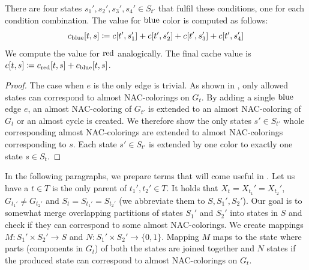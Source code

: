 \begin{lemma}
\begin{description}
	\end{description}
	There are four states \( s_1', s_2', s_3', s_4' \in S_{t'} \)
	that fulfil these conditions, one for each condition combination.
	The value for \( \text{blue} \) color is computed as follows:
	\begin{align*}
		c_{\text{blue}}[t, s] & \coloneqq c[t', s_1'] + c[t', s_2'] + c[t', s_3'] + c[t', s_4'] \\
	\end{align*}
	We compute the value for \( \text{red} \) analogically.
	The final cache value is \( c[t, s] \coloneqq c_{\text{red}}[t, s] + c_{\text{blue}}[t, s] \).
\end{lemma}
\begin{proof}
	The case when \( e \) is the only edge is trivial.
	As shown in ,
	only allowed states can correspond to almost NAC-colorings on \( G_t \).
	By adding a single \( \text{blue} \) edge \( e \),
	an almost NAC-coloring of \( G_{t'} \)
	is extended to an almost NAC-coloring of \( G_t \)
	or an almost cycle is created.
	We therefore show the only states \( s' \in S_{t'} \)
	whole corresponding almost NAC-colorings are extended
	to almost NAC-colorings corresponding to \( s \).
	Each state \( s' \in S_{t'} \) is extended by one color
	to exactly one state \( s \in S_t \).

\end{proof}

In the following paragraphs,
we prepare terms that will come useful in .
Let us have a \JoinNode{} \( t \in T \) is
the only parent of \( t_1', t_2' \in T \).
It holds that \( X_t = X_{t_1}' = X_{t_2}' \),
\( G_{t_1'} \ne G_{t_2'} \)
and \( S_t = S_{t_1'} = S_{t_2'} \)
(we abbreviate them to \( S, S_1', S_2' \)).
%
Our goal is to somewhat merge overlapping partitions of states \( S_1' \) and \( S_2' \)
into states in \( S \) and check if they can correspond to some almost NAC-colorings.
%
We create mappings \( M: S_1' \times S_2' \to S \) and \( N: S_1' \times S_2' \to \{0, 1\} \).
Mapping \( M \) maps to the state where parts (components in \( G_t \)) of both the states
are joined together and \( N \) states if the produced state
can correspond to almost NAC-colorings on \( G_t \).

